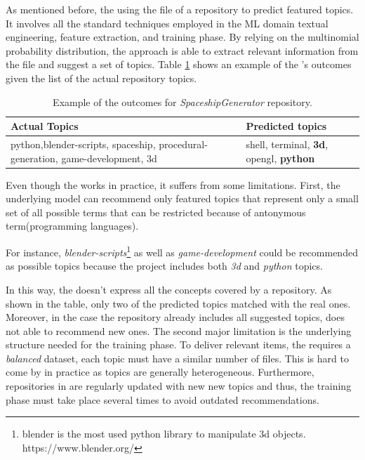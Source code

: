 As mentioned before, the \MNB using the \RM file of a repository to predict featured topics. It involves all the standard techniques employed in the ML domain \ie textual engineering, feature extraction, and training phase. By relying on the multinomial probability distribution, the approach is able to extract relevant information from the \RM file and suggest a set of topics. Table \ref{tab:example} shows an example of the \MNB's outcomes given the list of the actual repository topics. 

\begin{table}[h]
\centering

\resizebox{8.5cm}{!} {

\begin{tabular}{| p{3.2cm} | p{3.2cm} | }
\hline
 \textbf{Actual Topics} &\textbf{ Predicted topics} \\ \hline
     python,blender-scripts, spaceship, procedural-generation, game-development, 3d        &  
  shell, terminal, \textbf{3d},	opengl,	\textbf{python}        \\ \hline

\end{tabular}
}
\caption{Example of the \MNB outcomes for \emph{SpaceshipGenerator} repository.}
\label{tab:example}
\end{table} 



Even though the \MNB works in practice, it suffers from some limitations. First, the underlying model can recommend only featured topics that represent only a small set of all possible terms that can be restricted because of antonymous term(\eg programming languages).

For instance, \emph{blender-scripts}\footnote{blender is the most used python library to manipulate 3d objects. \url{}https://www.blender.org/} as well as \emph{game-development} could be recommended as possible topics because the project includes both \emph{3d} and \emph{python} topics.

In this way, the \MNB doesn't express all the concepts covered by a \GH repository. As shown in the table, only two of the predicted topics matched with the real ones. Moreover, in the case the repository already includes all suggested topics, \MNB does not able to recommend new ones.
The second major limitation is the underlying structure needed for the training phase. To deliver relevant items, the \MNB requires a \emph{balanced} dataset, \ie each topic must have a similar number of  \RM files. This is hard to come by in practice as topics are generally heterogeneous.
Furthermore, repositories in \GH are regularly updated with new new topics and thus, the training phase must take place several times to avoid outdated recommendations. 


